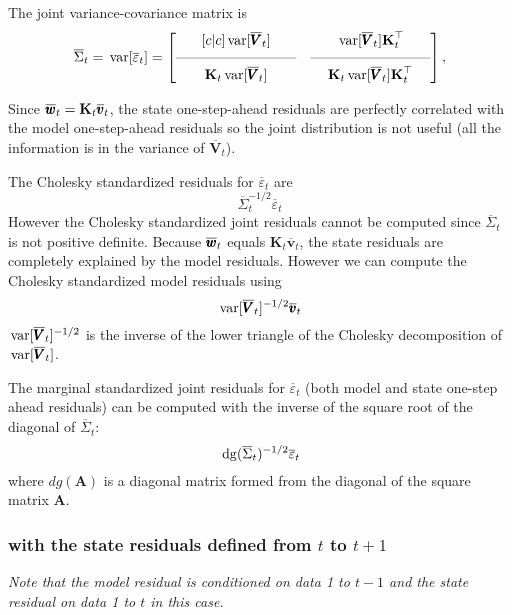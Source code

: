 \documentclass[]{article}
\def\AA{\mbox{$\mathbf A$}}	\def\aa{\mbox{$\mathbf a$}}
\def\KK{\mbox{$\mathbf K$}}
\def\VV{\mbox{$\pmb{V}$}}	\def\vv{\mbox{$\pmb{v}$}}
\def\var{\,\textup{\textrm{var}}}
\def\dg{\,\textup{\textrm{dg}}}
\def\checkwt{\overline{\ww}_t}
\def\checkvt{\overline{\vv}_t}
\def\checkVt{\overline{\VV}_t}
\begin{document}
The joint variance-covariance matrix is
\begin{equation}\label{eq:jointcondresid.onestep}
\overline{\Sigma}_t = \var[\overline{\varepsilon}_t] = \begin{bmatrix}[c|c]
 \var[\checkVt]&  \var[\checkVt]\KK_{t}^\top\\
 \rule[.5ex]{20ex}{0.25pt} & \rule[.5ex]{20ex}{0.25pt} \\
\KK_{t}\var[\checkVt]& \KK_{t}\var[\checkVt]\KK_{t}^\top \end{bmatrix},
\end{equation}

Since $\checkwt=\KK_t \checkvt$, the state one-step-ahead residuals are perfectly correlated with the model one-step-ahead residuals so the joint distribution is not useful (all the information is in the variance of $\checkVt$).


The Cholesky standardized residuals for $\overline{\varepsilon}_t$ are
\begin{equation}
\overline{\Sigma}_t^{-1/2} \overline{\varepsilon}_t
\end{equation}
However the Cholesky standardized joint residuals cannot be computed since $\overline{\Sigma}_t$ is not positive definite. Because $\checkwt$ equals $\KK_t \checkvt$, the state residuals are completely explained by the model residuals. However we can compute the Cholesky standardized model residuals using
\begin{equation}
\var[\checkVt]^{-1/2} \checkvt
\end{equation}
$\var[\checkVt]^{-1/2}$ is the inverse of the lower triangle of the Cholesky decomposition of $\var[\checkVt]$.

The marginal standardized joint residuals for $\overline{\varepsilon}_t$ (both model and state one-step ahead residuals) can be computed with the inverse of the square root of the diagonal of $\overline{\Sigma}_t$:
\begin{equation}
\dg(\overline{\Sigma}_t)^{-1/2} \overline{\varepsilon}_t
\end{equation}
where $dg(\AA)$ is a diagonal matrix formed from the diagonal of the square matrix $\AA$.

\subsubsection{with the state residuals defined from $t$ to $t+1$}

\emph{Note that the model residual is conditioned on data 1 to $t-1$ and the state residual on data 1 to $t$ in this case.}
\end{document}
